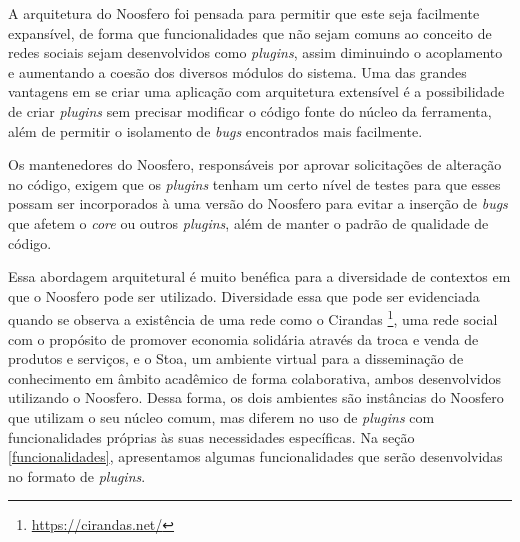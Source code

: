 
A arquitetura do Noosfero foi pensada para permitir que este seja facilmente
expansível, de forma que funcionalidades que não sejam comuns ao conceito de
redes sociais sejam desenvolvidos como \textit{plugins}, assim diminuindo
o acoplamento e aumentando a coesão dos diversos módulos do sistema.
%
Uma das grandes vantagens em se criar uma aplicação com arquitetura extensível
é a possibilidade de criar \textit{plugins} sem precisar modificar o código
fonte do núcleo da ferramenta, além de permitir o isolamento de
\textit{bugs} encontrados mais facilmente.

Os mantenedores do Noosfero, responsáveis por aprovar solicitações de
alteração no código, exigem que os \textit{plugins} tenham um certo nível de
testes para que esses possam ser incorporados à uma versão do Noosfero para
evitar a inserção de \textit{bugs} que afetem o \textit{core} ou
outros \textit{plugins}, além de manter o padrão de qualidade de código.

Essa abordagem arquitetural é muito benéfica para a diversidade de contextos
em que o Noosfero pode ser utilizado. Diversidade essa que pode ser evidenciada
quando se observa a existência de uma rede como o Cirandas%
\footnote{\url{https://cirandas.net/}},
uma rede social com o propósito de promover economia solidária através
da troca e venda de produtos e serviços, e o
Stoa, um ambiente virtual para a disseminação de conhecimento em âmbito
acadêmico de forma colaborativa, ambos desenvolvidos utilizando o Noosfero.
%
Dessa forma, os dois ambientes são instâncias do Noosfero que utilizam o seu núcleo comum,
mas diferem no uso de \textit{plugins} com funcionalidades próprias às suas necessidades específicas.
%
Na seção \ref{funcionalidades}, apresentamos algumas funcionalidades que serão
desenvolvidas no formato de \textit{plugins}.


